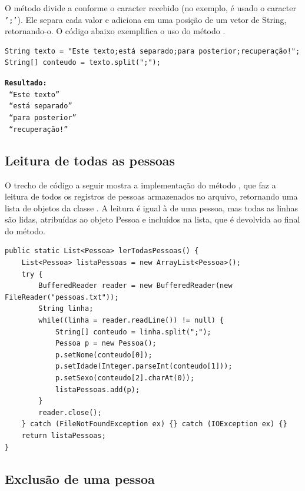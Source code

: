 O método  divide a  conforme o caracter recebido (no exemplo, é usado o caracter \texttt{';'}). Ele separa cada valor e adiciona em uma posição de um vetor de String, retornando-o. O código abaixo exemplifica o uso do método .

\begin{verbatim}
String texto = "Este texto;está separado;para posterior;recuperação!";
String[] conteudo = texto.split(";");
\end{verbatim}

\begin{minipage}{\textwidth}
	\textbf{\texttt{Resultado:}}\\
	\texttt{    ``Este texto''}\\
	\texttt{    ``está separado''}\\
	\texttt{    ``para posterior''}\\
	\texttt{    ``recuperação!''}\\
\end{minipage}


\subsection{Leitura de todas as pessoas}

O trecho de código a seguir mostra a implementação do método , que faz a leitura de todos os registros de pessoas armazenados no arquivo, retornando uma lista de objetos da classe . A leitura é igual à de uma pessoa, mas todas as linhas são lidas, atribuídas ao objeto Pessoa e incluídos na lista, que é devolvida ao final do método.

\begin{verbatim}
public static List<Pessoa> lerTodasPessoas() {
	List<Pessoa> listaPessoas = new ArrayList<Pessoa>();
	try {
		BufferedReader reader = new BufferedReader(new FileReader("pessoas.txt"));
		String linha;
		while((linha = reader.readLine()) != null) {
			String[] conteudo = linha.split(";");
			Pessoa p = new Pessoa();
			p.setNome(conteudo[0]);
			p.setIdade(Integer.parseInt(conteudo[1]));
			p.setSexo(conteudo[2].charAt(0));
			listaPessoas.add(p);
		}
		reader.close();
	} catch (FileNotFoundException ex) {} catch (IOException ex) {}
	return listaPessoas;
}
\end{verbatim}

\subsection{Exclusão de uma pessoa}

